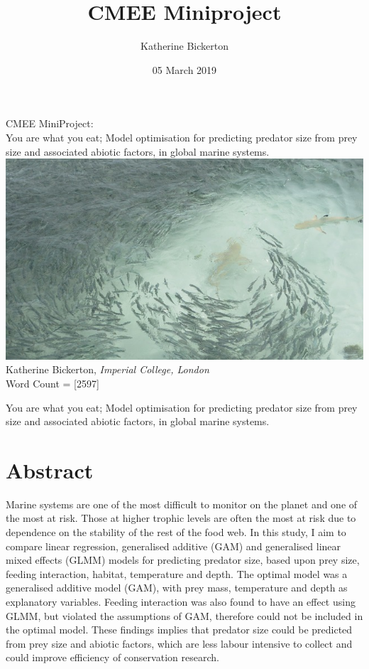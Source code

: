 \documentclass[11pt,a4paper]{article}
\title{CMEE Miniproject}
\date{05 March 2019}
\author{Katherine Bickerton}
\begin{document}
	
	\begin{titlepage}
		\centering
		{\Large
			\vskip4cm
			CMEE MiniProject:~\\
			\vskip1cm
			You are what you eat; Model optimisation for predicting predator size from prey size and associated abiotic factors, in global marine systems.
		}    
		\vskip2cm	
		\includegraphics[width = 15cm]{predprey.jpg}
		\vskip2cm	
		Katherine Bickerton, \textit{Imperial College, London}\\
		\vskip1cm		
		Word Count = [2597]
		\vspace*{\fill}
		\vspace*{\fill}
	\end{titlepage}
	
	
	\Large \noindent You are what you eat; Model optimisation for predicting predator size from prey size and associated abiotic factors, in global marine systems.
	\linenumbers
	
	\normalsize	
	\section{Abstract}
	
	\par \noindent Marine systems are one of the most difficult to monitor on the planet and one of the most at risk. Those at higher trophic levels are often the most at risk due to dependence on the stability of the rest of the food web. In this study, I aim to compare linear regression, generalised additive (GAM) and generalised linear mixed effects (GLMM) models for predicting predator size, based upon prey size, feeding interaction, habitat, temperature and depth. The optimal model was a generalised additive model (GAM), with prey mass, temperature and depth as explanatory variables. Feeding interaction was also found to have an effect using GLMM, but violated the assumptions of GAM, therefore could not be included in the optimal model. These findings implies that predator size could be predicted from prey size and abiotic factors, which are less labour intensive to collect and could improve efficiency of conservation research.
	
\end{document}
